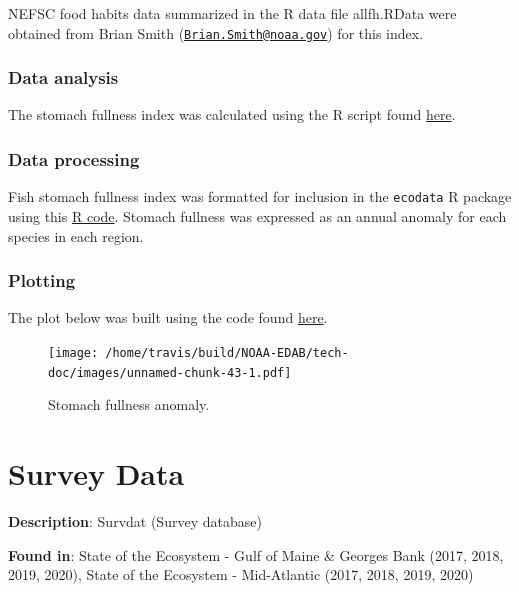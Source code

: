 \documentclass[
]{book}
\begin{document}
NEFSC food habits data summarized in the R data file allfh.RData were obtained from Brian Smith (\href{mailto:Brian.Smith@noaa.gov}{\nolinkurl{Brian.Smith@noaa.gov}}) for this index.

\hypertarget{data-analysis-38}{%
\subsection{Data analysis}\label{data-analysis-38}}

The stomach fullness index was calculated using the R script found \href{https://github.com/Laurels1/StomachFullness}{here}.

\hypertarget{data-processing-28}{%
\subsection{Data processing}\label{data-processing-28}}

Fish stomach fullness index was formatted for inclusion in the \texttt{ecodata} R package using this \href{https://github.com/NOAA-EDAB/ecodata/blob/master/data-raw/get_stom_fullness.R}{R code}. Stomach fullness was expressed as an annual anomaly for each species in each region.

\hypertarget{plotting-32}{%
\subsection{Plotting}\label{plotting-32}}

The plot below was built using the code found
\href{https://github.com/NOAA-EDAB/ecodata/blob/master/chunk-scripts/macrofauna.Rmd-ma-stomachs.R}{here}.

\begin{figure}
\centering
\texttt{[image: /home/travis/build/NOAA-EDAB/tech-doc/images/unnamed-chunk-43-1.pdf]}
\caption{\label{fig:unnamed-chunk-43}Stomach fullness anomaly.}
\end{figure}

\hypertarget{survdat}{%
\chapter{Survey Data}\label{survdat}}

\textbf{Description}: Survdat (Survey database)

\textbf{Found in}: State of the Ecosystem - Gulf of Maine \& Georges Bank (2017, 2018, 2019, 2020), State of the Ecosystem - Mid-Atlantic (2017, 2018, 2019, 2020)
\end{document}
